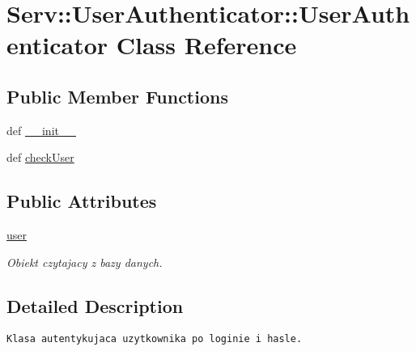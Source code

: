 \hypertarget{class_serv_1_1_user_authenticator_1_1_user_authenticator}{
\section{Serv::UserAuthenticator::UserAuthenticator Class Reference}
\label{class_serv_1_1_user_authenticator_1_1_user_authenticator}
}
\subsection*{Public Member Functions}
\begin{CompactItemize}
\item 
def \hyperlink{class_serv_1_1_user_authenticator_1_1_user_authenticator_8da26a197368b560fc5b51a56cf95ccf}{\_\-\_\-init\_\-\_\-}
\item 
def \hyperlink{class_serv_1_1_user_authenticator_1_1_user_authenticator_df35019818eb86047a9c8d1d415bf3e5}{checkUser}
\end{CompactItemize}
\subsection*{Public Attributes}
\begin{CompactItemize}
\item 
\hypertarget{class_serv_1_1_user_authenticator_1_1_user_authenticator_6f0f3992518647fc45cf548f9c5a79e8}{
\hyperlink{class_serv_1_1_user_authenticator_1_1_user_authenticator_6f0f3992518647fc45cf548f9c5a79e8}{user}}
\label{class_serv_1_1_user_authenticator_1_1_user_authenticator_6f0f3992518647fc45cf548f9c5a79e8}

\begin{CompactList}\small\item\em Obiekt czytajacy z bazy danych. \item\end{CompactList}\end{CompactItemize}


\subsection{Detailed Description}


\footnotesize\begin{verbatim}Klasa autentykujaca uzytkownika po loginie i hasle.\end{verbatim}
\normalsize
 


